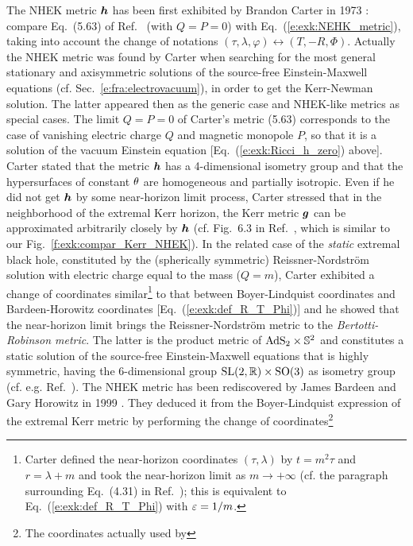 \begin{hist} \label{h:exk:NHEK_metric}
The NHEK metric $\bm{h}$ has been first exhibited by Brandon Carter in 1973 \cite{Carte73a}:
compare Eq.~(5.63) of Ref.~\cite{Carte73a} (with $Q=P=0$) with Eq.~(\ref{e:exk:NEHK_metric}),
taking into account the change of notations $(\tau,\lambda,\varphi) \leftrightarrow (T,-R,\Phi)$.
Actually the NHEK metric was found by Carter when searching for the most general stationary
and axisymmetric solutions of the source-free Einstein-Maxwell equations (cf. Sec.~\ref{e:fra:electrovacuum}), in order to get
the Kerr-Newman solution. The latter appeared then as the generic case and NHEK-like metrics as
special cases. The limit $Q=P=0$ of Carter's metric (5.63) corresponds to the case
of vanishing electric charge $Q$ and magnetic monopole $P$, so that it is a solution
of the vacuum Einstein equation  [Eq.~(\ref{e:exk:Ricci_h_zero}) above].
Carter stated that the metric $\bm{h}$ has a
4-dimensional isometry group and that the hypersurfaces of constant $\theta$ are
homogeneous and partially isotropic.
Even if he did not get $\bm{h}$ by some near-horizon limit process,
Carter stressed that in the neighborhood of the extremal Kerr horizon,
the Kerr metric $\bm{g}$ can
be approximated arbitrarily closely by $\bm{h}$
(cf. Fig.~6.3 in Ref.~\cite{Carte73a}, which is similar to our Fig.~\ref{f:exk:compar_Kerr_NHEK}).
In the related case of the \emph{static} extremal black hole,
constituted by the (spherically symmetric)
Reissner-Nordström solution
with electric charge equal to the mass ($Q = m$), Carter exhibited
a change of coordinates similar\footnote{Carter defined the near-horizon coordinates
$(\tau,\lambda)$ by $t = m^2 \tau$ and $r = \lambda + m$ and took the
near-horizon limit as $m\to +\infty$
(cf. the paragraph surrounding Eq.~(4.31) in Ref.~\cite{Carte73a});
this is equivalent to Eq.~(\ref{e:exk:def_R_T_Phi})
with $\varepsilon = 1/m$.}
to that between Boyer-Lindquist coordinates
and Bardeen-Horowitz coordinates [Eq.~(\ref{e:exk:def_R_T_Phi})] and
he showed that the near-horizon limit brings
the Reissner-Nordström metric to the
\emph{Bertotti-Robinson metric}.
The latter is the product metric of $\mathrm{AdS}_2\times\mathbb{S}^2$ and constitutes a static solution of
the source-free Einstein-Maxwell equations that is highly symmetric, having the 6-dimensional
group $\mathrm{SL}(2,\mathbb{R})\times\mathrm{SO}(3)$ as isometry group (cf. e.g. Ref.~\cite{GarfiG11}).
The NHEK metric has been rediscovered by James Bardeen and Gary Horowitz in 1999 \cite{BardeH99}. They deduced it from the Boyer-Lindquist expression of the extremal Kerr metric by performing the change of coordinates\footnote{The coordinates actually used by
}
\end{hist}
